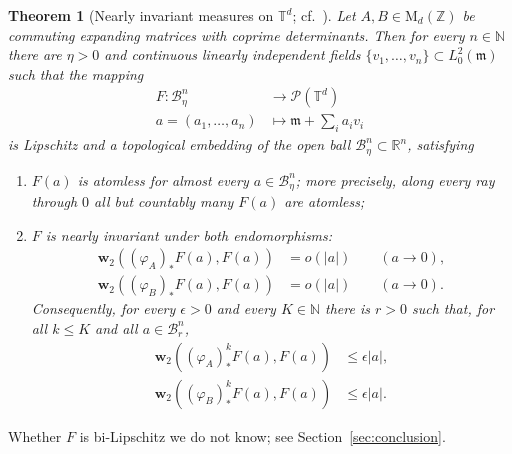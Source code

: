 \documentclass[11pt,reqno]{amsart}
\theoremstyle{plain}
\newtheorem{thm}{Theorem}[section]
\theoremstyle{definition}
\newcommand{\dw}{\mathbf{w}_2}
\newcommand{\T}{\mathbb{T}}
\newcommand{\Z}{\mathbb{Z}}
\newcommand{\R}{\mathbb{R}}
\newcommand{\N}{\mathbb{N}}
\newcommand{\Leb}{\mathfrak{m}}
\newcommand{\lto}{\longrightarrow}
\newcommand{\Prob}{\mathcal{P}}
\begin{document}
\begin{thm}[Nearly invariant measures on \( \T^d \); cf.\ {\cite[Theorem 1.4]{kloeckner_optimal_2013}}]
    \label{thm:families}
    Let \( A,B\in \mathrm{M}_d(\Z) \) be commuting expanding matrices with coprime determinants.
    Then for every \( n\in\N \) there are \( \eta>0 \) and continuous linearly independent fields \(\{v_1, \dots, v_n\} \subset L_0^2(\Leb)\) such that the mapping
    \begin{align*}
        F:\mathcal{B}^n_\eta & \lto  \Prob(\T^d)  \\
        a = (a_1,\dots,a_n)    & \longmapsto \Leb+\sum_ia_iv_i
    \end{align*}
    is Lipschitz and a topological embedding of the open ball \( \mathcal{B}^n_\eta \subset \R^n \), satisfying
    \begin{enumerate}
        \item\label{item:families.atomless} \( F(a) \) is atomless for almost every \( a\in \mathcal{B}_\eta^n \); more precisely, along every ray through \( 0 \) all but countably many \( F(a) \) are atomless;
        \item\label{item:families.invariant} \( F \) is nearly invariant under both endomorphisms:
        \begin{align*}
            \dw\left((\varphi_A)_\ast F(a),F(a)\right) &= o(\lvert a \rvert) \qquad (a\to0), \\
            \dw\left((\varphi_B)_\ast F(a),F(a)\right) &= o(\lvert a \rvert) \qquad (a\to0).
        \end{align*}
        Consequently, for every \( \epsilon>0 \) and every \( K\in\N \) there is \( r>0 \) such that, for all \( k\le K \) and all \( a\in \mathcal{B}_r^n \),
        \begin{align*}
            \dw\left(( \varphi_A )^k_\ast F(a),F(a)\right)&\le\epsilon\lvert a \rvert, \\
            \dw\left(( \varphi_B )^k_\ast F(a),F(a)\right)&\le\epsilon\lvert a \rvert.
        \end{align*}
    \end{enumerate}
\end{thm}

Whether \(F\) is bi-Lipschitz we do not know; see Section~\ref{sec:conclusion}.
\end{document}
